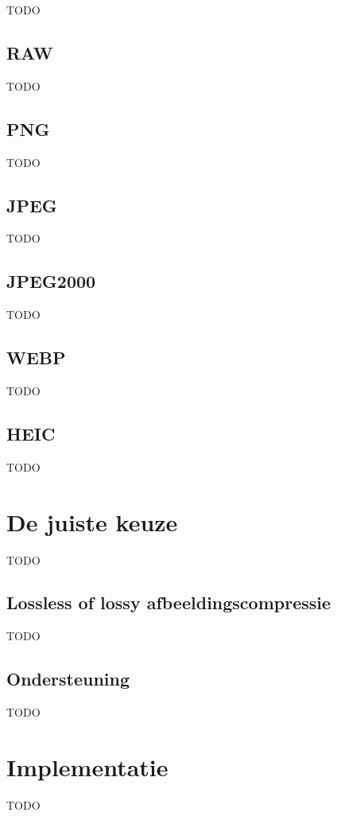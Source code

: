 TODO

\subsection{RAW}
\label{sec:afbeeldingscompressie-raw}

TODO

\subsection{PNG}
\label{sec:afbeeldingscompressie-png}

TODO

\subsection{JPEG}
\label{sec:afbeeldingscompressie-jpeg}

TODO

\subsection{JPEG2000}
\label{sec:afbeeldingscompressie-jpeg2000}

TODO

\subsection{WEBP}
\label{sec:afbeeldingscompressie-webp}

TODO

\subsection{HEIC}
\label{sec:afbeeldingscompressie-heic}

TODO

\section{De juiste keuze}
\label{sec:afbeeldingscompressie-keuze}

TODO

\subsection{Lossless of lossy afbeeldingscompressie}
\label{sec:afbeeldingscompressie-lossless-of-lossy}

TODO

\subsection{Ondersteuning}
\label{sec:afbeeldingscompressie-ondersteuning}

TODO

\section{Implementatie}
\label{sec:afbeeldingscompressie-implementatie}

TODO

